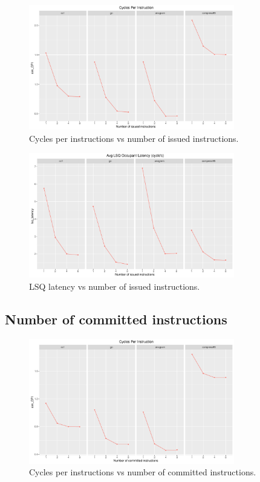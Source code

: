 \documentclass[10pt]{scrartcl}
\begin{document}
\begin{figure}[h]
  \centering
  \includegraphics[width=0.8\textwidth]{Plots/plot_I_sim_CPI}
  \caption{Cycles per instructions vs number of issued instructions.}\label{fig:i_sim_cpi}
\end{figure}

\begin{figure}[h]
  \centering
  \includegraphics[width=0.8\textwidth]{Plots/plot_I_lsq_latency}
  \caption{LSQ latency vs number of issued instructions.}\label{fig:i_lsq_latency}
\end{figure}

\FloatBarrier

\subsection{Number of committed instructions}

\begin{figure}[h]
  \centering
  \includegraphics[width=0.8\textwidth]{Plots/plot_C_sim_CPI}
  \caption{Cycles per instructions vs number of committed instructions.}\label{fig:c_sim_cpi}
\end{figure}
\end{document}
